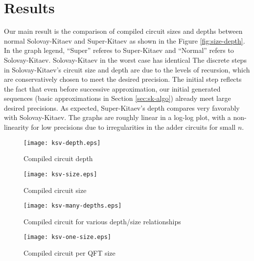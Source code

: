 \section{Results}
\label{sec:results}

Our main result is the comparison of compiled circuit sizes and depths between 
normal Solovay-Kitaev and Super-Kitaev as shown in the Figure
\ref{fig:size-depth}. In the graph legend, ``Super'' referes to Super-Kitaev
and ``Normal'' refers to Solovay-Kitaev.
Solovay-Kitaev in the worst case has identical
The discrete steps in Solovay-Kitaev's circuit size and depth are due
to the levels of recursion, which are conservatively chosen to meet
the desired precision. The initial step reflects the fact that even
before successive approximation, our initial generated sequences
(basic approximations in Section \ref{sec:sk-algo}) already meet large
desired precisions. As expected, Super-Kitaev's depth compares very
favorably with Solovay-Kitaev.
The graphs are roughly linear in a log-log plot, with a non-linearity
for low precisions due to irregularities in the adder circuits for small
$n$.


\begin{center}
\begin{figure}[h!]
\label{fig:depth}
\texttt{[image: ksv-depth.eps]}
\caption{Compiled circuit depth}
\end{figure}
\end{center}

\begin{center}
\begin{figure}[h!]
\label{fig:size}
\texttt{[image: ksv-size.eps]}
\caption{Compiled circuit size}
\end{figure}
\end{center}

\begin{center}
\begin{figure}[h!]
\label{fig:many-depth}
\texttt{[image: ksv-many-depths.eps]}
\caption{Compiled circuit for various depth/size relationships}
\end{figure}
\end{center}

\begin{center}
\begin{figure}[h!]
\label{fig:one-size}
\texttt{[image: ksv-one-size.eps]}
\caption{Compiled circuit per QFT size}
\end{figure}
\end{center}

